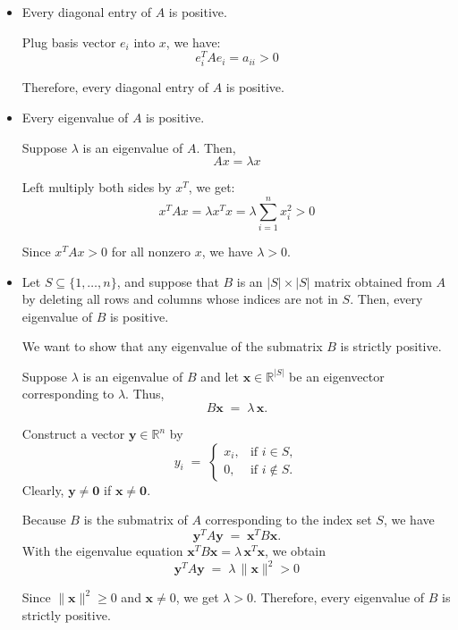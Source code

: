 \documentclass{article}
\begin{document}
\begin{itemize}
    \item Every diagonal entry of $A$ is positive.
    
    Plug basis vector $e_i$ into $x$, we have:
    \[
    e_i^T A e_i = a_{ii} > 0
    \]

    Therefore, every diagonal entry of $A$ is positive.

    \item Every eigenvalue of $A$ is positive.

    Suppose $\lambda$ is an eigenvalue of $A$. Then,
    \[
    Ax = \lambda x
    \]

    Left multiply both sides by $x^T$, we get:
    \[
    x^T A x = \lambda x^T x = \lambda \sum_{i=1}^n x_i^2 > 0
    \]

    Since $x^T A x > 0$ for all nonzero $x$, we have $\lambda > 0$.

    \item Let $S \subseteq \{1,\ldots,n\}$, and suppose that $B$ is an $|S| \times |S|$ matrix obtained from $A$ by deleting all rows and columns whose indices are not in $S$. Then, every eigenvalue of $B$ is positive.

We want to show that any eigenvalue of the submatrix \(B\) is strictly positive.

Suppose \(\lambda\) is an eigenvalue of \(B\) and let \(\mathbf{x} \in \mathbb{R}^{|S|}\)
be an eigenvector corresponding to \(\lambda\). Thus,
\[
B \mathbf{x} \;=\; \lambda \, \mathbf{x}.
\]

Construct a vector \(\mathbf{y} \in \mathbb{R}^n\) by
\[
y_i \;=\;
\begin{cases}
x_i, & \text{if } i \in S, \\
0,   & \text{if } i \notin S.
\end{cases}
\]
Clearly, \(\mathbf{y} \neq \mathbf{0}\) if \(\mathbf{x} \neq \mathbf{0}\).

Because \(B\) is the submatrix of \(A\) corresponding to the index set \(S\),
we have
\[
\mathbf{y}^T A \mathbf{y}
\;=\;
\mathbf{x}^T B \mathbf{x}.
\]
With the eigenvalue equation \(\mathbf{x}^T B \mathbf{x} = \lambda \, \mathbf{x}^T \mathbf{x}\),
we obtain
\[
\mathbf{y}^T A \mathbf{y}
\;=\;
\lambda \, \|\mathbf{x}\|^2 > 0
\]

Since \(\|\mathbf{x}\|^2 \ge 0\) and \(\mathbf{x} \neq 0\), we get \(\lambda > 0\).
Therefore, every eigenvalue of \(B\) is strictly positive.

\end{itemize}
\end{document}
